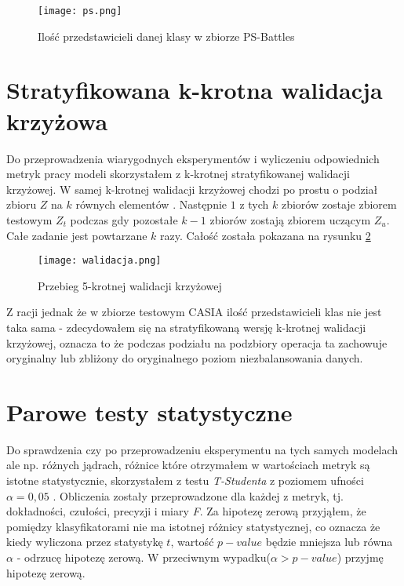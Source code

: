 \begin{figure}[h!]
	\texttt{[image: ps.png]}
	\centering
	\caption{Ilość przedstawicieli danej klasy w zbiorze PS-Battles}
	\label{fig:ps}
\end{figure}

\section{Stratyfikowana k-krotna walidacja krzyżowa}

Do przeprowadzenia wiarygodnych eksperymentów i wyliczeniu odpowiednich metryk pracy modeli skorzystałem z k-krotnej stratyfikowanej walidacji krzyżowej. W samej k-krotnej walidacji krzyżowej chodzi po prostu o podział zbioru $Z$ na $k$ równych elementów \cite{hands_on}. Następnie $1$ z tych $k$ zbiorów zostaje zbiorem testowym $Z_{t}$ podczas gdy pozostałe $k-1$ zbiorów zostają zbiorem uczącym $Z_u$. Całe zadanie jest powtarzane $k$ razy. Całość została pokazana na rysunku \ref{fig:walidacja}

\begin{figure}[h!]
	\texttt{[image: walidacja.png]}
	\centering
	\caption{Przebieg 5-krotnej walidacji krzyżowej}
	\label{fig:walidacja}
\end{figure}

Z racji jednak że w zbiorze testowym CASIA \cite{casia} ilość przedstawicieli klas nie jest taka sama - zdecydowałem się na stratyfikowaną wersję k-krotnej walidacji krzyżowej, oznacza to że podczas podziału na podzbiory operacja ta zachowuje oryginalny lub zbliżony do oryginalnego poziom niezbalansowania danych.

\section{Parowe testy statystyczne}

Do sprawdzenia czy po przeprowadzeniu eksperymentu na tych samych modelach ale np. różnych jądrach, różnice które otrzymałem w wartościach metryk są istotne statystycznie, skorzystałem z testu \textit{T-Studenta} z poziomem ufności $\alpha = 0,05$ \cite{stata}. Obliczenia zostały przeprowadzone dla każdej z metryk, tj. dokładności, czułości, precyzji i miary \textit{F}. Za hipotezę zerową przyjąłem, że pomiędzy klasyfikatorami nie ma istotnej różnicy statystycznej, co oznacza że kiedy wyliczona przez statystykę $t$, wartość $p-value$ będzie mniejsza lub równa $\alpha$ - odrzucę hipotezę zerową. W przeciwnym wypadku($\alpha>p-value$) przyjmę hipotezę zerową.

